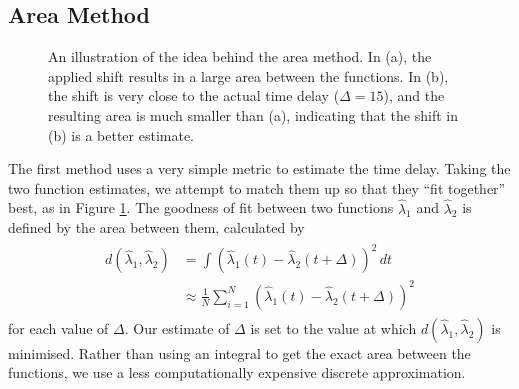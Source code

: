 \documentclass[a4paper,11pt]{article}
\begin{document}
\subsection{Area Method}
\label{sec-4-1}

   \begin{figure}[]

   \caption{An illustration of the idea behind the area method. In (a), the
   applied shift results in a large area between the functions. In (b), the
   shift is very close to the actual time delay ($\Delta=15$), and the resulting
   area is much smaller than (a), indicating that the shift in (b) is a better
   estimate.}

   \label{fig:areamethod}
   \end{figure}
   The first method uses a very simple metric to estimate the time delay. Taking
   the two function estimates, we attempt to match them up so that they ``fit
   together'' best, as in Figure \ref{fig:areamethod}. The goodness of fit
   between two functions $\hat{\lambda}_1$ and $\hat{\lambda}_2$ is defined by
   the area between them, calculated by
   \begin{align}
   \begin{split}
   d(\hat{\lambda}_1,\hat{\lambda}_2)&=\int(\hat{\lambda}_1(t)-\hat{\lambda}_2(t+\Delta))^2\,dt\\
   &\approx\frac{1}{N}\sum_{i=1}^N(\hat{\lambda}_1(t)-\hat{\lambda}_2(t+\Delta))^2
   \end{split}
   \end{align}
   for each value of $\Delta$. Our estimate of $\Delta$ is set to the value at
   which $d(\hat{\lambda}_1,\hat{\lambda}_2)$ is minimised. Rather than using an
   integral to get the exact area between the functions, we use a less
   computationally expensive discrete approximation.
\end{document}
